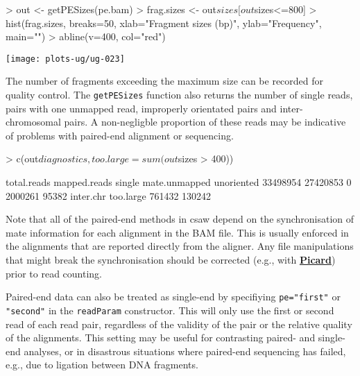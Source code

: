 \documentclass[12pt]{report}
\renewenvironment{Schunk}{\vspace{0pt}}{\vspace{0pt}}
\newcommand{\pkgname}{csaw}
\newcommand{\code}[1]{{\small\texttt{#1}}}
\begin{document}
\begin{Schunk}
\begin{Sinput}
> out <- getPESizes(pe.bam)
> frag.sizes <- out$sizes[out$sizes<=800]
> hist(frag.sizes, breaks=50, xlab="Fragment sizes (bp)", ylab="Frequency", main="")
> abline(v=400, col="red")
\end{Sinput}
\end{Schunk}

\begin{center}
\texttt{[image: plots-ug/ug-023]}
\end{center}

The number of fragments exceeding the maximum size can be recorded for quality control. 
The \code{getPESizes} function also returns the number of single reads, pairs with one unmapped read, improperly orientated pairs and inter-chromosomal pairs.
A non-negligble proportion of these reads may be indicative of problems with paired-end alignment or sequencing. 

\begin{Schunk}
\begin{Sinput}
> c(out$diagnostics, too.large=sum(out$sizes > 400))
\end{Sinput}
\begin{Soutput}
  total.reads  mapped.reads        single mate.unmapped    unoriented 
     33498954      27420853             0       2000261         95382 
    inter.chr     too.large 
       761432        130242 
\end{Soutput}
\end{Schunk}

Note that all of the paired-end methods in \pkgname{} depend on the synchronisation of mate information for each alignment in the BAM file. 
This is usually enforced in the alignments that are reported directly from the aligner. 
Any file manipulations that might break the synchronisation should be corrected (e.g., with \href{http://broadinstitute.github.io/picard}{\textbf{Picard}}) prior to read counting.

Paired-end data can also be treated as single-end by specifiying \code{pe="first"} or \code{"second"} in the \code{readParam} constructor. 
This will only use the first or second read of each read pair, regardless of the validity of the pair or the relative quality of the alignments.
This setting may be useful for contrasting paired- and single-end analyses, or in disastrous situations where paired-end sequencing has failed, e.g., due to ligation between DNA fragments.
\end{document}
